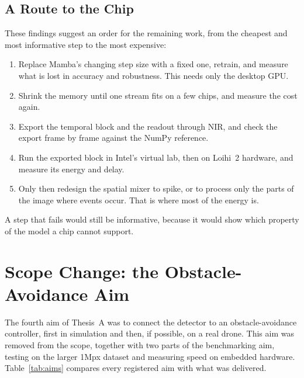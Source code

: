 \documentclass[11pt, a4paper]{report}
\begin{document}
\subsection{A Route to the Chip}
\label{subsec:route}
These findings suggest an order for the remaining work, from the cheapest and most informative step to the
most expensive:
\begin{enumerate}
  \item Replace Mamba's changing step size with a fixed one, retrain, and measure what is lost in accuracy
        and robustness. This needs only the desktop GPU.
  \item Shrink the memory until one stream fits on a few chips, and measure the cost again.
  \item Export the temporal block and the readout through NIR, and check the export frame by frame against
        the NumPy reference.
  \item Run the exported block in Intel's virtual lab, then on Loihi~2 hardware, and measure its energy and
        delay.
  \item Only then redesign the spatial mixer to spike, or to process only the parts of the image where
        events occur. That is where most of the energy is.
\end{enumerate}
A step that fails would still be informative, because it would show which property of the model a chip cannot support.

\section{Scope Change: the Obstacle-Avoidance Aim}
\label{sec:scope_change}
The fourth aim of Thesis~A was to connect the detector to an obstacle-avoidance controller, first in
simulation and then, if possible, on a real drone. This aim was removed from the scope, together with two
parts of the benchmarking aim, testing on the larger 1Mpx dataset and measuring speed on embedded hardware.
Table~\ref{tab:aims} compares every registered aim with what was delivered.
\end{document}

